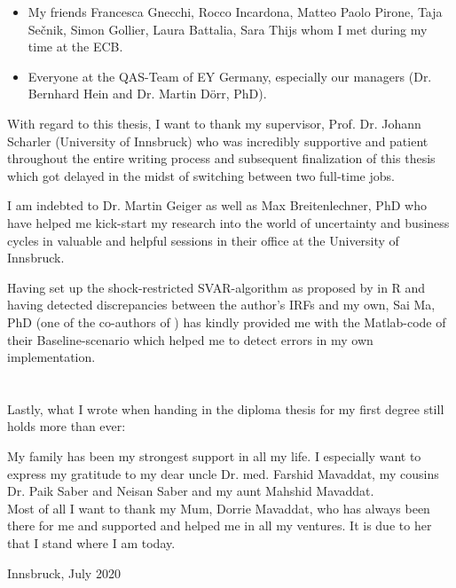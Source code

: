 \documentclass[a4paper,11pt,listof=nochaptergap,oneside,pointednumbers,bibtotoc,bigheadings,liststotoc,hidelinks]{scrbook}
\theoremstyle{mysatz}
\theoremstyle{mydefinition}
\theoremstyle{mytheorem}
\theoremstyle{mybemerkung}
\begin{document}
\newpage
\thispagestyle{empty} %
\begin{itemize}
	\item My friends Francesca Gnecchi, Rocco Incardona, Matteo Paolo Pirone, Taja Sečnik, Simon Gollier, Laura Battalia, Sara Thijs whom I met during my time at the ECB.
	\item Everyone at the QAS-Team of EY Germany, especially our managers (Dr. Bernhard Hein and Dr. Martin Dörr, PhD).
\end{itemize}


%
%
\vspace*{40px}
With regard to this thesis, I want to thank my supervisor, Prof. Dr. Johann Scharler (University of Innsbruck) who was incredibly supportive and patient throughout the entire writing process and subsequent finalization of this thesis which got delayed in the midst of switching between two full-time jobs.

I am indebted to Dr. Martin Geiger as well as Max Breitenlechner, PhD who have helped me kick-start my research into the world of uncertainty and business cycles in valuable and helpful sessions in their office at the University of Innsbruck. 

Having set up the shock-restricted SVAR-algorithm as proposed by \citet{ludvigsonetal:18, ludvigsonetal:19} in R and having detected discrepancies between the author's IRFs and my own, Sai Ma, PhD (one of the co-authors of \citet{ludvigsonetal:18, ludvigsonetal:19}) has kindly provided me with the Matlab-code of their Baseline-scenario which helped me to detect errors in my own implementation.\\
\\
\\
Lastly, what I wrote when handing in the diploma thesis for my first degree still holds more than ever:

My family has been my strongest support in all my life. I especially want to express my gratitude to my dear uncle Dr. med. Farshid Mavaddat, my cousins Dr. Paik Saber and Neisan Saber and my aunt Mahshid Mavaddat.\\
Most of all I want to thank my Mum, Dorrie Mavaddat, who has always been there for me and supported and helped me in all my ventures. It is due to her that I stand where I am today.
    \begin{flushright}
         Innsbruck, July 2020\\
    \end{flushright}
\vspace*{\fill}
%
\pagestyle{headings}
\end{document}
